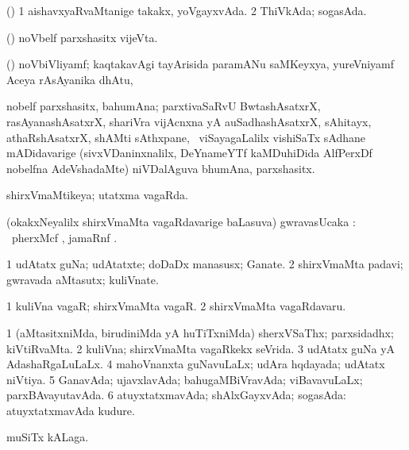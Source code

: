 \bentry
{}
\gl{\gu}
\bmng
(\ashi) 
\bnum
\num{1} aishavxyaRvaMtanige takakx, yoVgayxvAda. 
\num{2} ThiVkAda; sogasAda. 
\enum
\emng
\eentry

\bentry
{}
\gl{\nA}
\bmng
(\ame) noVbelf parxshasitx vijeVta. 
\emng
\eentry

\bentry
{}
\gl{\nA}
\bmng
(\ravi) noVbiVliyamf; kaqtakavAgi tayArisida  paramANu saMKeyxya, yureVniyamf Aceya rAsAyanika dhAtu, \saMkeV\  
\emng
\eentry

\bentry
{}
\gl{\nA}
\bmng
nobelf parxshasitx, bahumAna; parxtivaSaRvU BwtashAsatxrX, rasAyanashAsatxrX, shariVra vijAcnxna yA auSadhashAsatxrX, sAhitayx, athaRshAsatxrX, shAMti sAthxpane, \mo\ viSayagaLalilx vishiSaTx sAdhane mADidavarige (sivxVDaninxnalilx, DeYnameYTf kaMDuhiDida AlfPerxDf nobelfna AdeVshadaMte) niVDalAguva bhumAna, parxshasitx. 
\emng
\eentry

\bentry
{}
\gl{\gu}
\bmng
shirxVmaMtikeya; utatxma vagaRda. 
\emng

\noindent
\gl{\pagu}
\bmng
 (okakxNeyalilx shirxVmaMta vagaRdavarige baLasuva) gwravasUcaka \upa: \udA\ pherxMcf , jamaRnf . 
\emng
\eentry

\bentry
{}
\gl{\nA}
\bmng
\bnum
\num{1} udAtatx guNa; udAtatxte; doDaDx manasusx; Ganate. 
\num{2} shirxVmaMta padavi; gwravada aMtasutx; kuliVnate. 
\enum
\emng

\noindent
\gl{\pagu}
\bmng
\bnum
\num{1}  kuliVna vagaR; shirxVmaMta vagaR. 
\num{2}  shirxVmaMta vagaRdavaru. 
\enum
\emng
\eentry

\bentry
{}
\gl{\gu}
\bmng
\bnum
\num{1} (aMtasitxniMda, birudiniMda yA huTiTxniMda) sherxVSaThx; parxsidadhx; kiVtiRvaMta. 
\num{2} kuliVna; shirxVmaMta vagaRkekx seVrida. 
\num{3} udAtatx guNa yA AdashaRgaLuLaLx. 
\num{4} mahoVnanxta guNavuLaLx; udAra hqdayada; udAtatx niVtiya. 
\num{5} GanavAda; ujavxlavAda; bahugaMBiVravAda; viBavavuLaLx; parxBAvayutavAda. 
\num{6} atuyxtatxmavAda; shAlxGayxvAda; sogasAda:  atuyxtatxmavAda kudure. 
\enum
\emng

\noindent
\gl{\pagu}
\bmng
{} muSiTx kALaga. 
\emng
\eentry

